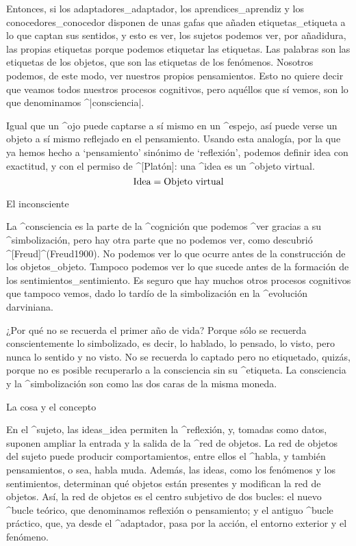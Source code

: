 
Entonces, si los adaptadores_{adaptador}, los aprendices_{aprendiz} y
los conocedores_{conocedor} disponen de unas gafas que añaden
etiquetas_{etiqueta} a lo que captan sus sentidos, y esto es ver, los
sujetos podemos ver, por añadidura, las propias etiquetas porque podemos
etiquetar las etiquetas. Las palabras son las etiquetas de los objetos,
que son las etiquetas de los fenómenos. Nosotros podemos, de este modo,
ver nuestros propios pensamientos. Esto no quiere decir que veamos todos
nuestros procesos cognitivos, pero aquéllos que sí vemos, son lo que
denominamos ^|consciencia|.

Igual que un ^{ojo} puede captarse a sí mismo en un ^{espejo}, así puede
verse un objeto a sí mismo reflejado en el pensamiento. Usando esta
analogía, por la que ya hemos hecho a `pensamiento' sinónimo de
`reflexión', podemos definir idea con exactitud, y con el permiso de
^[Platón]: una ^{idea} es un ^{objeto virtual}.
$$\hbox{Idea} = \hbox{Objeto virtual}$$


\Section El inconsciente

La ^{consciencia} es la parte de la ^{cognición} que podemos ^{ver}
gracias a su ^{simbolización}, pero hay otra parte que no podemos ver,
como descubrió ^[Freud]^(Freud1900). No podemos ver lo que ocurre antes
de la construcción de los objetos_{objeto}. Tampoco podemos ver lo que
sucede antes de la formación de los sentimientos_{sentimiento}. Es
seguro que hay muchos otros procesos cognitivos que tampoco vemos, dado
lo tardío de la simbolización en la ^{evolución} darviniana.

¿Por qué no se recuerda el primer año de vida? Porque sólo se recuerda
conscientemente lo simbolizado, es decir, lo hablado, lo pensado, lo
visto, pero nunca lo sentido y no visto. No se recuerda lo captado pero
no etiquetado, quizás, porque no es posible recuperarlo a la consciencia
sin su ^{etiqueta}. La consciencia y la ^{simbolización} son como las
dos caras de la misma moneda.


\Section La cosa y el concepto

En el ^{sujeto}, las ideas_{idea} permiten la ^{reflexión}, y, tomadas
como datos, suponen ampliar la entrada y la salida de la ^{red de
objetos}. La red de objetos del sujeto puede producir comportamientos,
entre ellos el ^{habla}, y también pensamientos, o sea, habla muda.
Además, las ideas, como los fenómenos y los sentimientos, determinan qué
objetos están presentes y modifican la red de objetos. Así, la red de
objetos es el centro subjetivo de dos bucles: el nuevo ^{bucle teórico},
que denominamos reflexión o pensamiento; y el antiguo ^{bucle práctico},
que, ya desde el ^{adaptador}, pasa por la acción, el entorno exterior y
el fenómeno.

